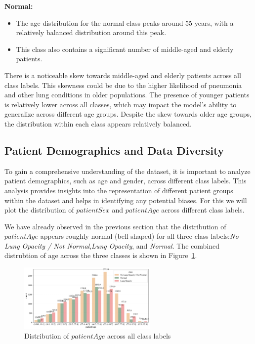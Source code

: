 \textbf{Normal:}
\begin{itemize}
    \item The age distribution for the normal class peaks around 55 years, with a relatively balanced distribution around this peak.
    \item This class also contains a significant number of middle-aged and elderly patients.
\end{itemize}

There is a noticeable skew towards middle-aged and elderly patients across all class labels. This skewness could be due to the higher likelihood of pneumonia and other lung conditions in older populations.
The presence of younger patients is relatively lower across all classes, which may impact the model's ability to generalize across different age groups. Despite the skew towards older age groups, the distribution within each class appears relatively balanced.

\subsection{Patient Demographics and Data Diversity}
\label{subsec:chap2 section 1.3}

To gain a comprehensive understanding of the dataset, it is important to analyze patient demographics, such as age and gender, across different class labels. This analysis provides insights into the representation of different patient groups within the dataset and helps in identifying any potential biases. For this we will plot the distribution of $patientSex$ and $patientAge$ across different class labels.

We have already observed in the previous section that the distribution of $patientAge$ appears roughly normal (bell-shaped) for all three class labels:\emph{No Lung Opacity / Not Normal},\emph{Lung Opacity}, and \emph{Normal}. The combined distrubtion of age across the three classes is shown in Figure~\ref{fig:cha-2 figure5}.

\begin{figure}[H]
    \begin{center}
        \includegraphics[width = 0.6\textwidth]{figures/Figure8.png}
        \caption{Distribution of $patientAge$ across all class labels}
        \label{fig:cha-2 figure5}
    \end{center}
\end{figure}

